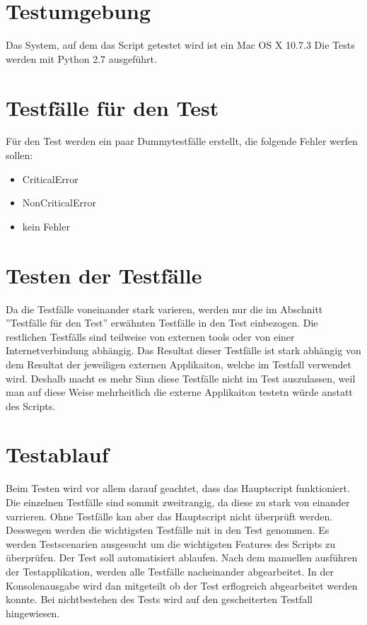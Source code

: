 
\section{Testumgebung}
Das System, auf dem das Script getestet wird ist ein Mac OS X 10.7.3
Die Tests werden mit Python 2.7 ausgeführt.

\section{Testfälle für den Test}
Für den Test werden ein paar Dummytestfälle erstellt, die folgende Fehler werfen sollen:
\begin{itemize}
    \item CriticalError
    \item NonCriticalError 
    \item kein Fehler 
\end{itemize}

\section{Testen der Testfälle}
Da die Testfälle voneinander stark varieren, werden nur die im Abschnitt ''Testfälle für den Test'' erwähnten Testfälle in den Test einbezogen. Die restlichen Testfälls sind teilweise von externen tools oder von einer Internetverbindung abhängig. Das Resultat dieser Testfälle ist stark abhängig von dem Resultat der jeweiligen externen Applikaiton, welche im Testfall verwendet wird. Deshalb macht es mehr Sinn diese Testfälle nicht im Test auszulassen, weil man auf diese Weise mehrheitlich die externe Applikaiton testetn würde anstatt des Scripts.  

\section{Testablauf}
Beim Testen wird vor allem darauf geachtet, dass das Hauptscript funktioniert. Die einzelnen Testfälle sind sommit zweitrangig, da diese zu stark von einander varrieren. Ohne Testfälle kan aber das Hauptscript nicht überprüft werden. Desswegen werden die wichtigsten Testfälle mit in den Test genommen.
Es werden Testscenarien ausgesucht um die wichtigsten Features des Scripts zu überprüfen.
Der Test soll automatisiert ablaufen. Nach dem manuellen ausführen der Testapplikation, werden alle Testfälle nacheinander abgearbeitet. In der Konsolenausgabe wird dan mitgeteilt ob der Test erflogreich abgearbeitet werden konnte. Bei nichtbestehen des Tests wird auf den gescheiterten Testfall hingewiesen.  

